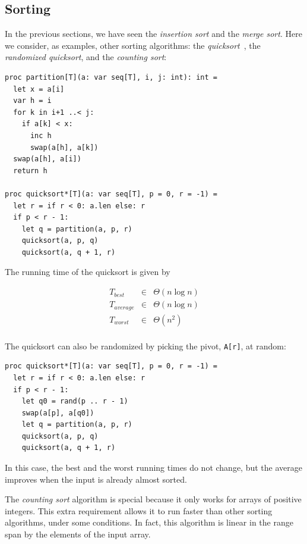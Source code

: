 \documentclass[justified, sixbynine]{tufte-book}
\def\ft{\small\tt}
\theoremstyle{plain}%
\newtheorem * {corollary}{Corollary}
\theoremstyle{definition}
\theoremstyle{remark}
\newtheorem * {remark}{Remark}
\newtheorem * {note}{Note}
\begin{document}
\begin{fullwidth}
\goodbreak\subsection{Sorting}


In the previous sections, we have seen the {\it insertion sort} and the {\it merge sort}. Here we consider, as examples, other sorting algorithms: the {\it quicksort}~\cite{mergesort}, the {\it randomized quicksort}, and the {\it counting sort}:

\begin{lstlisting}
proc partition[T](a: var seq[T], i, j: int): int =
  let x = a[i]
  var h = i
  for k in i+1 ..< j:
    if a[k] < x:
      inc h
      swap(a[h], a[k])
  swap(a[h], a[i])
  return h

proc quicksort*[T](a: var seq[T], p = 0, r = -1) =
  let r = if r < 0: a.len else: r
  if p < r - 1:
    let q = partition(a, p, r)
    quicksort(a, p, q)
    quicksort(a, q + 1, r)
\end{lstlisting}

The running time of the quicksort is given by

\begin{eqnarray}
T_{best} &\in &\Theta (n\log n) \\
T_{average} &\in &\Theta (n\log n) \\
T_{worst} &\in &\Theta (n^2) \\
\end{eqnarray}

The quicksort can also be randomized by picking the pivot, {\ft A[r]}, at random:
\begin{lstlisting}
proc quicksort*[T](a: var seq[T], p = 0, r = -1) =
  let r = if r < 0: a.len else: r
  if p < r - 1:
    let q0 = rand(p .. r - 1)
    swap(a[p], a[q0])
    let q = partition(a, p, r)
    quicksort(a, p, q)
    quicksort(a, q + 1, r)
\end{lstlisting}

In this case, the best and the worst running times do not change, but the average improves when the input is already almost sorted.


The {\it counting sort} algorithm is special because it only works for arrays of positive integers. This extra requirement allows it to run faster than other sorting algorithms, under some conditions. In fact, this algorithm is linear in the range span by the elements of the input array.


\end{fullwidth}
\end{document}
